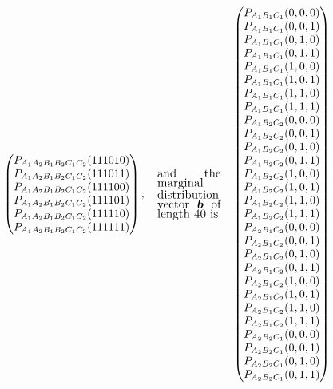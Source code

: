 \documentclass[aps,english,superscriptaddress,onecolumn,twoside,longbibliography,pra,floatfix,fleqn,nofootinbib]{revtex4-1}%
\theoremstyle{definition}
\newcommand{\p}[2][]{{P_{#1}}\parenths{#2}}
\DeclarePairedDelimiter{\parenths}{\lparen}{\rparen}
\begin{document}
\begin{align}
{\begin{pmatrix}
 \p[A_1 A_2 B_1 B_2 C_1 C_2]{1 1 1 0 1 0} \\
 \p[A_1 A_2 B_1 B_2 C_1 C_2]{1 1 1 0 1 1} \\
 \p[A_1 A_2 B_1 B_2 C_1 C_2]{1 1 1 1 0 0} \\
 \p[A_1 A_2 B_1 B_2 C_1 C_2]{1 1 1 1 0 1} \\
 \p[A_1 A_2 B_1 B_2 C_1 C_2]{1 1 1 1 1 0} \\
 \p[A_1 A_2 B_1 B_2 C_1 C_2]{1 1 1 1 1 1} \\
\end{pmatrix},\quad
\parbox{2cm}{\fontsize{11pt}{0pt}\selectfont
and the marginal distribution vector $\bm{b}$ of length 40 is 
}\quad
\begin{pmatrix}
 \p[A_1 B_1 C_1]{0,0,0} \\
 \p[A_1 B_1 C_1]{0,0,1} \\
 \p[A_1 B_1 C_1]{0,1,0} \\
 \p[A_1 B_1 C_1]{0,1,1} \\
 \p[A_1 B_1 C_1]{1,0,0} \\
 \p[A_1 B_1 C_1]{1,0,1} \\
 \p[A_1 B_1 C_1]{1,1,0} \\
 \p[A_1 B_1 C_1]{1,1,1} \\
 \p[A_1 B_2 C_2]{0,0,0} \\
 \p[A_1 B_2 C_2]{0,0,1} \\
 \p[A_1 B_2 C_2]{0,1,0} \\
 \p[A_1 B_2 C_2]{0,1,1} \\
 \p[A_1 B_2 C_2]{1,0,0} \\
 \p[A_1 B_2 C_2]{1,0,1} \\
 \p[A_1 B_2 C_2]{1,1,0} \\
 \p[A_1 B_2 C_2]{1,1,1} \\
 \p[A_2 B_1 C_2]{0,0,0} \\
 \p[A_2 B_1 C_2]{0,0,1} \\
 \p[A_2 B_1 C_2]{0,1,0} \\
 \p[A_2 B_1 C_2]{0,1,1} \\
 \p[A_2 B_1 C_2]{1,0,0} \\
 \p[A_2 B_1 C_2]{1,0,1} \\
 \p[A_2 B_1 C_2]{1,1,0} \\
 \p[A_2 B_1 C_2]{1,1,1} \\
 \p[A_2 B_2 C_1]{0,0,0} \\
 \p[A_2 B_2 C_1]{0,0,1} \\
 \p[A_2 B_2 C_1]{0,1,0} \\
 \p[A_2 B_2 C_1]{0,1,1} \\

\end{pmatrix}}
\end{align}
\end{document}
